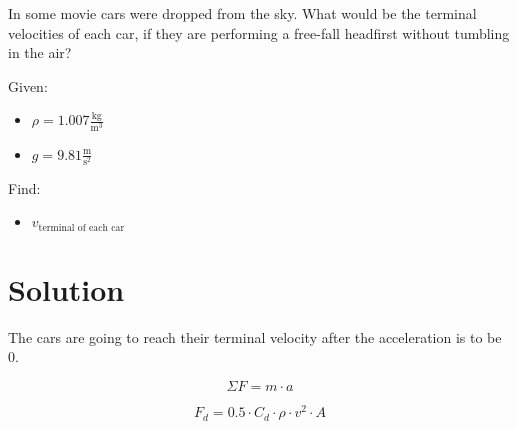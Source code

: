 
In some movie cars were dropped from the sky.
What would be the terminal velocities of each car, if they are
performing a free-fall headfirst without tumbling in the air?

\bigbreak Given:
\begin{itemize}
    \item $ \rho = 1.007 \frac{\text{kg}}{\text{m}^3} $
    \item $ g = 9.81 \frac{\text{m}}{\text{s}^2} $
\end{itemize}

Find:
\begin{itemize}
    \item $ v_{\text{terminal of each car}} $
\end{itemize}


\section*{Solution}

The cars are going to reach their terminal velocity after the acceleration is to be 0. 

\begin{equation}
    \label{eq:newtons}
    \Sigma F = m \cdot a
\end{equation}



\begin{equation}
    \label{eq:freefall}
    F_d = 0.5 \cdot C_d \cdot \rho \cdot v^2 \cdot A
\end{equation}


